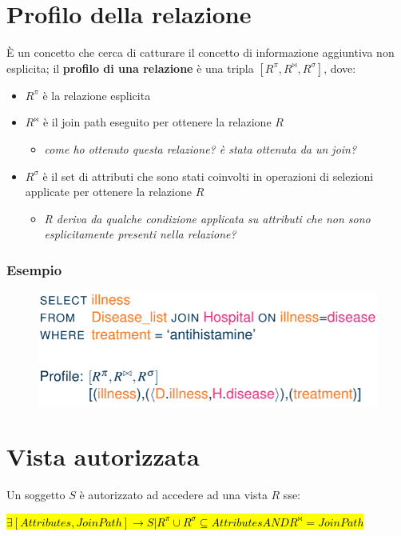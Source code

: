 \documentclass{report}
\begin{document}
\section{Profilo della relazione}
È un concetto che cerca di catturare il concetto di informazione aggiuntiva non esplicita;
il \textbf{profilo di una relazione} è una tripla $[R^\pi, R^{\bowtie}, R^\sigma]$, dove:
\begin{itemize}
    \item $R^\pi$ è la relazione esplicita
    \item $R^{\bowtie}$ è il join path eseguito per ottenere la relazione $R$
    \begin{itemize}
        \item \textit{come ho ottenuto questa relazione? è stata ottenuta da un join?}
    \end{itemize}
    \item $R^\sigma$ è il set di attributi che sono stati coinvolti in operazioni di selezioni 
    applicate per ottenere la relazione $R$
    \begin{itemize}
        \item \textit{R deriva da qualche condizione applicata su attributi che non sono esplicitamente presenti nella relazione?}
    \end{itemize}
\end{itemize}

\subsubsection{Esempio}

\begin{figure}[H]
    \centering
    \includegraphics[width=0.7\linewidth]{images/relation-profile-ex.png}
\end{figure}

\section{Vista autorizzata}

Un soggetto $S$ è autorizzato ad accedere ad una vista $R$ sse:

\noindent \hl{ $\exists [Attributes, Join Path]
\rightarrow S | R^\pi \cup R^\sigma \subseteq Attributes AND R^{\bowtie} = Join Path$}
\end{document}
